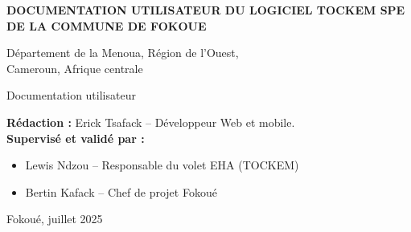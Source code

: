 \begin{titlepage}
    \centering
    \vspace*{2cm}
    {\LARGE\bfseries DOCUMENTATION UTILISATEUR DU LOGICIEL TOCKEM SPE\\[0.5em]
    DE LA COMMUNE DE FOKOUE\par}
    \vspace{1.5cm}
    {\large Département de la Menoua, Région de l'Ouest,\\Cameroun, Afrique centrale\par}
    \vspace{2cm}
    {\Large Documentation utilisateur\par}
    \vfill
    \begin{flushleft}
        \textbf{Rédaction :} Erick Tsafack -- Développeur Web et mobile.\\[0.8em]
        \textbf{Supervisé et validé par :}
        \begin{itemize}
            \item Lewis Ndzou -- Responsable du volet EHA (TOCKEM)
            \item Bertin Kafack -- Chef de projet Fokoué
        \end{itemize}
    \end{flushleft}
    \vspace{1cm}
    {\large Fokoué, juillet 2025\par}
\end{titlepage}
